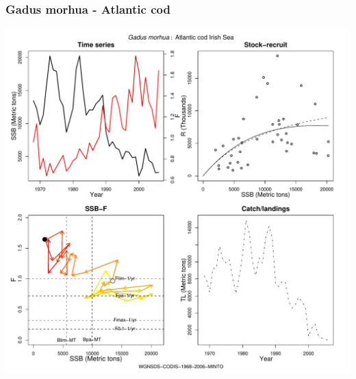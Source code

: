 \subsubsection{Gadus morhua - Atlantic cod}
\begin{center}
\includegraphics[width=1.2\textwidth]{../R/figures/WGNSDS-CODIS-1968-2006-MINTO.pdf}
\end{center}


